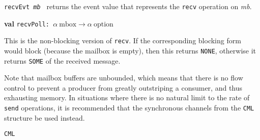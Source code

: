 \begin{descr}
\begin{speccomment}
\item {\tt recv\-Evt \textit{mb}         } 
returns the event value that represents the \texttt{recv} operation 	on \textit{mb}.\-     \end{speccomment}
\item {}{\textbf{val}} {\tt recvPoll: \(\alpha\:\mathrm{mbox}\rightarrow \alpha\:\mathrm{option}\)}\label{val-MAILBOX.recvPoll}


\begin{speccomment}
\item 

        This is the non-blocking version of \texttt{recv}.\- 	If the corresponding blocking form would block (because the mailbox is 	empty), then this returns 	\texttt{NONE}, otherwise it returns 	\texttt{SOME} of the received 	message.\-\end{speccomment}
\end{descr}


Note that mailbox buffers are unbounded, which means that there is no flow control to prevent a producer from greatly outstriping a consumer, and thus exhausting memory.\- In situations where there is no natural limit to the rate of \texttt{send} operations, it is recommended that the synchronous channels from the \texttt{CML} structure be used instead.\-
\begin{seealso}
\texttt{CML}
\end{seealso}
